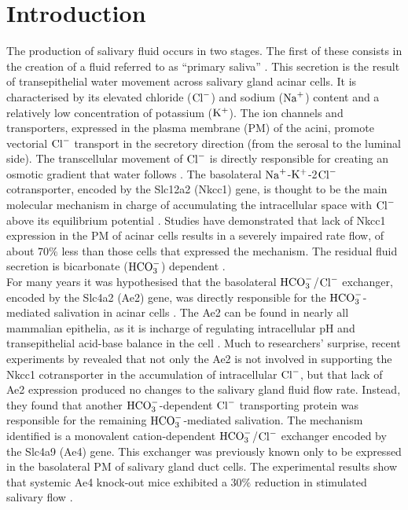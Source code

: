 \documentclass{svjour3}
\newcommand{\kplus}{{\rm K}^+}
\newcommand{\na}{{\rm Na}^+}
\newcommand{\hco}{{\rm HCO}_3^-}
\newcommand{\cl}{{\rm Cl}^-}
\begin{document}
\section{Introduction}
The production of salivary fluid occurs in two stages. The first of these consists in the creation of a fluid referred to as ``primary saliva'' \citep{martinez1966micropuncture}. This secretion is the result of transepithelial water movement across salivary gland acinar cells. It is characterised by its elevated chloride ($\cl$) and sodium ($\na$) content and a relatively low concentration of potassium ($\kplus$). The ion channels and transporters, expressed in the plasma membrane (PM) of the acini, promote vectorial $\cl$ transport in the secretory direction (from the serosal to the luminal side). The transcellular movement of $\cl$ is directly responsible for creating an osmotic gradient that water follows \citep{silva1977mechanism}. The basolateral $\na$-$\kplus$-2$\cl$ cotransporter, encoded by the Slc12a2 (Nkcc1) gene, is thought to be the main molecular mechanism in charge of accumulating the intracellular space with $\cl$ above its equilibrium potential \citep{melvin2005regulation}. Studies have demonstrated that lack of Nkcc1 expression in the PM of acinar cells results in a severely impaired rate flow, of about 70$\%$ less than those cells that expressed the mechanism. The residual fluid secretion is bicarbonate ($\hco$) dependent \citep{evans2000severe}.\\

For many years it was hypothesised that the basolateral $\hco$/$\cl$ exchanger, encoded by the Slc4a2 (Ae2) gene, was directly responsible for the $\hco$-mediated salivation in acinar cells \citep{nguyen2004cl,evans2000severe}. The Ae2 can be found in nearly all mammalian epithelia, as it is incharge of regulating intracellular pH and transepithelial acid-base balance in the cell \citep{holappa2001identification}. Much to researchers' surprise, recent experiments by \cite{pena2015ae4} revealed that not only the Ae2 is not involved in supporting the Nkcc1 cotransporter in the accumulation of intracellular $\cl$, but that lack of Ae2 expression produced no changes to the salivary gland fluid flow rate. Instead, they found that another $\hco$-dependent $\cl$ transporting protein was responsible for the remaining $\hco$-mediated salivation. The mechanism identified is a monovalent cation-dependent $\hco$/$\cl$ exchanger encoded by the Slc4a9 (Ae4) gene. This exchanger was previously known only to be expressed in the basolateral PM of salivary gland duct cells. The experimental results show that systemic Ae4 knock-out mice exhibited a 30$\%$ reduction in stimulated salivary flow \citep{pena2015ae4}. \\
\end{document}
